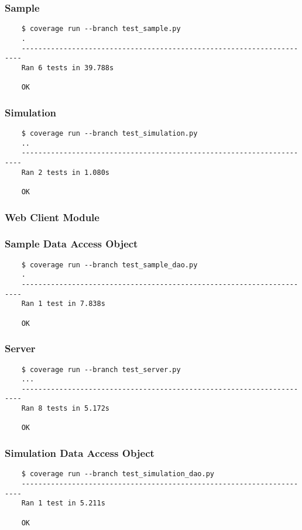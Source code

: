 \documentclass[a4paper,11pt]{article}
\begin{document}
\subsubsection*{{\hspace{6mm}}Sample}
\begin{verbatim}
    $ coverage run --branch test_sample.py
    .
    ----------------------------------------------------------------------
    Ran 6 tests in 39.788s

    OK
\end{verbatim}

\subsubsection*{{\hspace{6mm}}Simulation}
\begin{verbatim}
    $ coverage run --branch test_simulation.py
    ..
    ----------------------------------------------------------------------
    Ran 2 tests in 1.080s

    OK
\end{verbatim}

\subsubsection{Web Client Module}
\subsubsection*{{\hspace{6mm}}Sample Data Access Object}
\begin{verbatim}
    $ coverage run --branch test_sample_dao.py 
    .
    ----------------------------------------------------------------------
    Ran 1 test in 7.838s

    OK
\end{verbatim}

\subsubsection*{{\hspace{6mm}}Server}
\begin{verbatim}
    $ coverage run --branch test_server.py
    ...
    ----------------------------------------------------------------------
    Ran 8 tests in 5.172s

    OK
\end{verbatim}

\subsubsection*{{\hspace{6mm}}Simulation Data Access Object}
\begin{verbatim}
    $ coverage run --branch test_simulation_dao.py
    ----------------------------------------------------------------------
    Ran 1 test in 5.211s

    OK
\end{verbatim}
\end{document}
